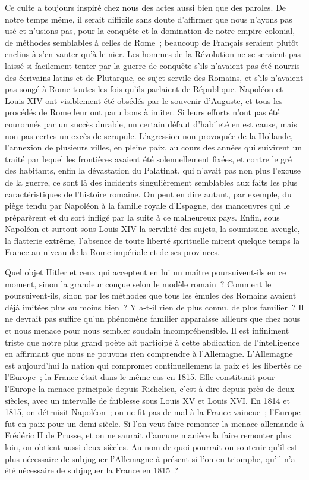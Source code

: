 \documentclass[french,twoside]{book} %
\begin{document}
Ce culte a toujours inspiré chez nous des actes aussi bien que des paroles. De notre temps même, il serait difficile sans doute d'affirmer que nous n'ayons pas usé et n'usions pas, pour la conquête et la domination de notre empire colonial, de méthodes semblables à celles de Rome ; beaucoup de Français seraient plutôt enclins à s'en vanter qu'à le nier. Les hommes de la Révolution ne se seraient pas laissé si facilement tenter par la guerre de conquête s'ils n'avaient pas été nourris des écrivains latins et de Plutarque, ce sujet servile des Romains, et s'ils n'avaient pas songé à Rome toutes les fois qu'ils parlaient de République. Napoléon et Louis XIV ont visiblement été obsédés par le souvenir d'Auguste, et tous les procédés de Rome leur ont paru bons à imiter. Si leurs efforts n'ont pas été couronnés par un succès durable, un certain défaut d'habileté en est cause, mais non pas certes un excès de scrupule. L'agression non provoquée de la Hollande, l'annexion de plusieurs villes, en pleine paix, au cours des années qui suivirent un traité par lequel les frontières avaient été solennellement fixées, et contre le gré des habitants, enfin la dévastation du Palatinat, qui n'avait pas non plus l'excuse de la guerre, ce sont là des incidents singulièrement semblables aux faits les plus caractéristiques de l'histoire romaine. On peut en dire autant, par exemple, du piège tendu par Napoléon à la famille royale d'Espagne, des manœuvres qui le préparèrent et du sort infligé par la suite à ce malheureux pays. Enfin, sous Napoléon et surtout sous Louis XIV la servilité des sujets, la soumission aveugle, la flatterie extrême, l'absence de toute liberté spirituelle mirent quelque temps la France au niveau de la Rome impériale et de ses provinces.\par
Quel objet Hitler et ceux qui acceptent en lui un maître poursuivent-ils en ce moment, sinon la grandeur conçue selon le modèle romain ? Comment le poursuivent-ils, sinon par les méthodes que tous les émules des Romains avaient déjà imitées plus ou moins bien ? Y a-t-il rien de plus connu, de plus familier ? Il ne devrait pas suffire qu'un phénomène familier apparaisse ailleurs que chez nous et nous menace pour nous sembler soudain incom­préhensible. Il est infiniment triste que notre plus grand poète ait participé à cette abdication de l'intelligence en affirmant que nous ne pouvons rien comprendre à l'Allemagne. L'Allemagne est aujourd'hui la nation qui com­promet continuellement la paix et les libertés de l'Europe ; la France était dans le même cas en 1815. Elle constituait pour l'Europe la menace principale depuis Richelieu, c'est-à-dire depuis près de deux siècles, avec un intervalle de faiblesse sous Louis XV et Louis XVI. En 1814 et 1815, on détruisit Napoléon ; on ne fit pas de mal à la France vaincue ; l'Europe fut en paix pour un demi-siècle. Si l'on veut faire remonter la menace allemande à Frédéric II de Prusse, et on ne saurait d'aucune manière la faire remonter plus loin, on obtient aussi deux siècles. Au nom de quoi pourrait-on soutenir qu'il est plus nécessaire de subjuguer l'Allemagne à présent si l'on en triomphe, qu'il n'a été nécessaire de subjuguer la France en 1815 ?\par
\end{document}

